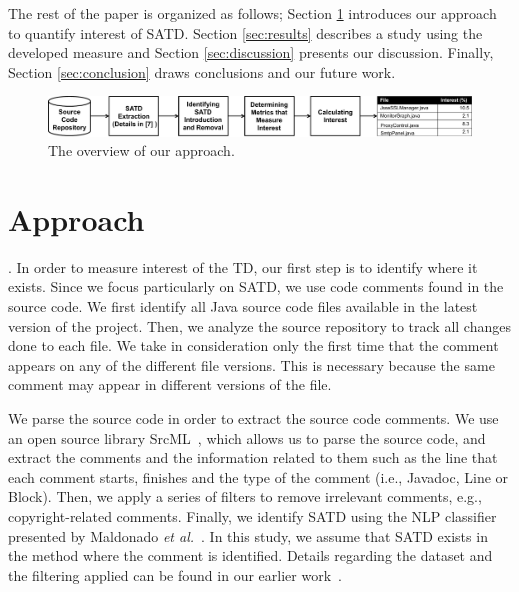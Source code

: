 \documentclass[10pt, conference]{IEEEtran}
\newcommand{\ea}{{\em et al.}}
\newcommand{\smallsection}[1]{\vspace{1mm}\noindent {\bf #1}.\hspace{2mm}}
\begin{document}
The rest of the paper is organized as follows; Section \ref{sec:approach} introduces our approach to quantify interest of SATD. Section \ref{sec:results} describes a study using the developed measure and Section \ref{sec:discussion} presents our discussion. Finally, Section \ref{sec:conclusion} draws conclusions and our future work.

\begin{figure}[!t]
  \begin{center}
  \includegraphics[width=.95\textwidth]{figures/overview}
  \caption{The overview of our approach.}
  \label{fig:overview}
  \end{center}
\end{figure}

\section{Approach} \label{sec:approach}

\smallsection{1. SATD Extraction}
In order to measure interest of the TD, our first step is to identify where it exists. Since we focus particularly on SATD, we use code comments found in the source code. We first identify all Java source code files available in the latest version of the project. Then, we analyze the source repository to track all changes done to each file. We take in consideration only the first time that the comment appears on any of the different file versions. This is necessary because the same comment may appear in different versions of the file. 

We parse the source code in order to extract the source code comments. We use an open source library SrcML~\cite{Collard_ICSM2013}, which allows us to parse the source code, and extract the comments and the information related to them such as the line that each comment starts, finishes and the type of the comment (i.e., Javadoc, Line or Block). Then, we apply a series of filters to remove irrelevant comments, e.g., copyright-related comments. Finally, we identify SATD using the NLP classifier presented by Maldonado \ea~\cite{Maldonado_TSE2017}. In this study, we assume that SATD exists in the method where the comment is identified. Details regarding the dataset and the filtering applied can be found in our earlier work~\cite{Maldonado_TSE2017}.
\end{document}
